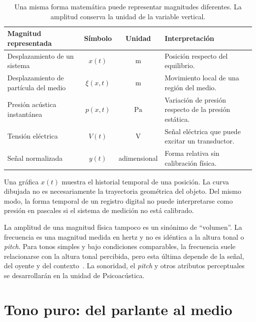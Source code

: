 \begin{table}[htbp]
    \centering
    \small
    \setlength{\tabcolsep}{5pt}
    \begin{tabular}{|>{\raggedright\arraybackslash}p{}|c|c|>{\raggedright\arraybackslash}p{}|}
        \hline
        \textbf{Magnitud representada} & \textbf{Símbolo} &
        \textbf{Unidad} & \textbf{Interpretación} \\
        \hline
        Desplazamiento de un sistema & \(x(t)\) & \(\text{m}\) &
        Posición respecto del equilibrio. \\
        \hline
        Desplazamiento de partícula del medio & \(\xi(x,t)\) & \(\text{m}\) &
        Movimiento local de una región del medio. \\
        \hline
        Presión acústica instantánea & \(p(x,t)\) & \(\text{Pa}\) &
        Variación de presión respecto de la presión estática. \\
        \hline
        Tensión eléctrica & \(V(t)\) & \(\text{V}\) &
        Señal eléctrica que puede excitar un transductor. \\
        \hline
        Señal normalizada & \(y(t)\) & adimensional &
        Forma relativa sin calibración física. \\
        \hline
    \end{tabular}
    \caption{Una misma forma matemática puede representar magnitudes
    diferentes. La amplitud conserva la unidad de la variable vertical.}
    \label{tab:u3-variables-sinusoidales}
\end{table}

Una gráfica \(x(t)\) muestra el historial temporal de una posición. La curva
dibujada no es necesariamente la trayectoria geométrica del objeto. Del mismo
modo, la forma temporal de un registro digital no puede interpretarse como
presión en pascales si el sistema de medición no está calibrado.

La amplitud de una magnitud física tampoco es un sinónimo de ``volumen''. La
frecuencia es una magnitud medida en hertz y no es idéntica a la altura tonal
o \emph{pitch}. Para tonos simples y bajo condiciones comparables, la
frecuencia suele relacionarse con la altura tonal percibida, pero esta última
depende de la señal, del oyente y del contexto~\cite{oxenham2018}. La sonoridad, el
\emph{pitch} y otros atributos perceptuales se desarrollarán en la unidad de
Psicoacústica.

\section{Tono puro: del parlante al medio}
\label{sec:u3-tono-puro}

